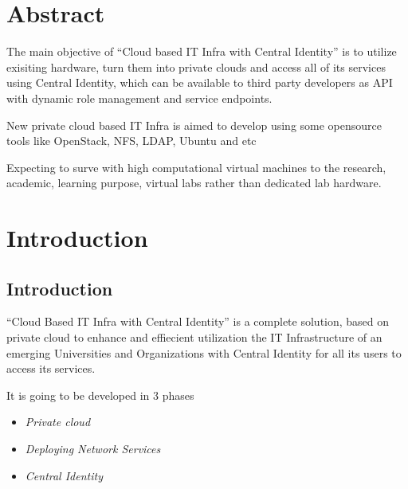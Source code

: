 \documentclass[12pt]{report}
\begin{document}
 
\chapter*{Abstract}
\setcounter{page}{1}
\normalsize
\hspace{0.5cm} The main objective of ``Cloud based IT Infra with Central Identity'' is to utilize exisiting hardware, turn them into private clouds and access all of its services using 
Central Identity, which can be available to third party developers as API with dynamic role management and service endpoints. \newline

New private cloud based IT Infra is aimed to develop using some opensource tools like OpenStack, NFS, LDAP, Ubuntu and etc \newline

Expecting to surve with high computational virtual machines to the research, academic, learning purpose, virtual labs rather than dedicated lab hardware.


\setcounter{page}{2}
\tableofcontents
\listoffigures
\listoftables
\pagebreak \thispagestyle{empty} \pagebreak

 
\setcounter{page}{1}


\chapter{Introduction}

\section{Introduction}
	``Cloud Based IT Infra with Central Identity'' is a complete solution, based on private cloud to enhance and effiecient utilization the IT Infrastructure of an emerging Universities and Organizations with Central Identity for all its users to access its services.\newline

	It is going to be developed in 3 phases 
	\begin{itemize}
		\item \textit{Private cloud} 
		\item \textit{Deploying Network Services} 
		\item \textit{Central Identity}
	\end{itemize}
	
\end{document}
